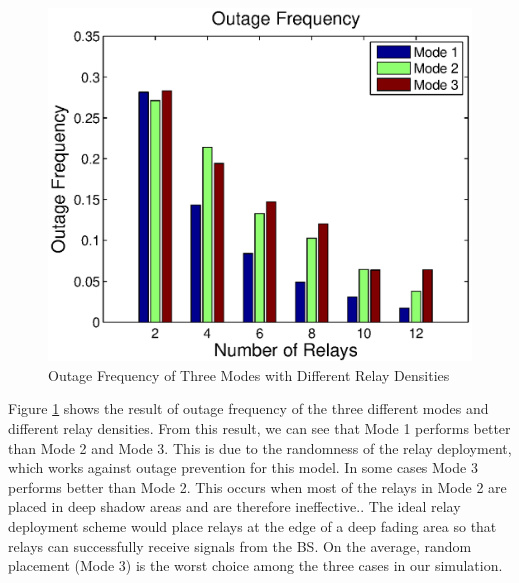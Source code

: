\begin{figure}
\centering
\includegraphics[width=12cm]{outagefrequency_V2.eps}
\caption{Outage Frequency of Three Modes with Different Relay Densities}
\label{outagefrequency}
\end{figure}
Figure \ref{outagefrequency} shows the result of outage frequency of the three different modes and different relay densities. From this result, we can see that Mode 1 performs better than Mode 2 and Mode 3. This is due to the randomness of the relay deployment, which works against outage prevention for this model. In some cases Mode 3 performs better than Mode 2. This occurs when most of the relays in Mode 2 are placed in deep shadow areas and are therefore ineffective.. The ideal relay deployment scheme would place relays at the edge of a deep fading area so that relays can successfully receive signals from the BS. On the average, random placement (Mode 3) is the worst choice among the three cases in our simulation.
